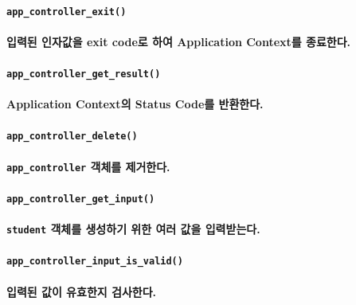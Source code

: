 \documentclass[UTF8]{report}
\begin{document}
            \paragraph{\texttt{app\_controller\_exit()}}
            \paragraph{%
                \normalfont 입력된 인자값을 exit code로 하여 Application Context를 종료한다.
            }

            \paragraph{\texttt{app\_controller\_get\_result()}}
            \paragraph{%
                \normalfont Application Context의 Status Code를 반환한다.
            }

            \paragraph{\texttt{app\_controller\_delete()}}
            \paragraph{%
                \normalfont \texttt{app\_controller} 객체를 제거한다.
            }

            \paragraph{\texttt{app\_controller\_get\_input()}}
            \paragraph{%
                \normalfont \texttt{student} 객체를 생성하기 위한 여러 값을 입력받는다.
            }

            \paragraph{\texttt{app\_controller\_input\_is\_valid()}}
            \paragraph{%
                \normalfont 입력된 값이 유효한지 검사한다.
            }
\end{document}
